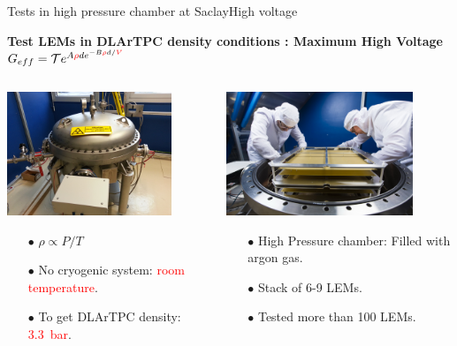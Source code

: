 \documentclass[10pt]{beamer}
\begin{document}
    \begin{frame}{Tests in high pressure chamber at Saclay}{High voltage}
    	\begin{scriptsize}
    		\begin{center}
    			\textbf{Test LEMs in DLArTPC density conditions : Maximum High Voltage}\\
    			$G _{eff}= \mathcal{T}e^{A\textcolor{red}{\rho} d e^{-B\textcolor{red}{\rho}d/\textcolor{red}{V}}}$
    		\end{center} 
    		\begin{columns}
		    	\begin{column}{0.5\textwidth}
		    		\includegraphics[height=3.7cm]{figures/666/gamelle.jpg}\\
		    		\begin{itemize}
		    			\item[$\bullet$] $\rho \propto P/T$
		    			\item[$\bullet$] No cryogenic system: \textcolor{red}{room temperature}.
		    			\item[$\bullet$] To get DLArTPC density: \textcolor{red}{\SI{3.3}{\bar}}.
		    		\end{itemize}
		    	\end{column}\hfill
		    	\begin{column}{0.5\textwidth}
		    		\includegraphics[height=3.7cm]{figures/666/6lems_gamelle.jpg}\\
		    		\begin{itemize}
		    			\item[$\bullet$] High Pressure chamber: Filled with argon gas.
		    			\item[$\bullet$] Stack of 6-9 LEMs.
		    			\item[$\bullet$] Tested more than 100 LEMs.
		    		\end{itemize}
		    	\end{column}
		    \end{columns}
	    \end{scriptsize} 
    \end{frame}
    
\end{document}
